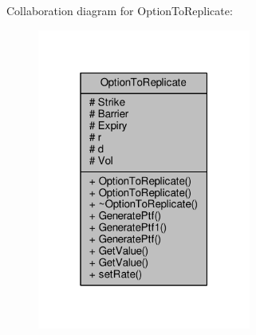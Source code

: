 Collaboration diagram for Option\+To\+Replicate\+:
\nopagebreak
\begin{figure}[H]
\begin{center}
\leavevmode
\includegraphics[width=199pt]{classOptionToReplicate__coll__graph}
\end{center}
\end{figure}
